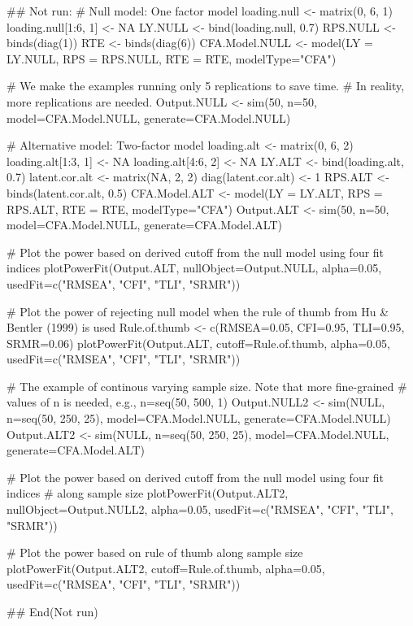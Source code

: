 \documentclass[a4paper]{book}
\begin{document}
\begin{Examples}
\begin{ExampleCode}
## Not run: 
# Null model: One factor model
loading.null <- matrix(0, 6, 1)
loading.null[1:6, 1] <- NA
LY.NULL <- bind(loading.null, 0.7)
RPS.NULL <- binds(diag(1))
RTE <- binds(diag(6))
CFA.Model.NULL <- model(LY = LY.NULL, RPS = RPS.NULL, RTE = RTE, modelType="CFA")

# We make the examples running only 5 replications to save time.
# In reality, more replications are needed.
Output.NULL <- sim(50, n=50, model=CFA.Model.NULL, generate=CFA.Model.NULL) 

# Alternative model: Two-factor model
loading.alt <- matrix(0, 6, 2)
loading.alt[1:3, 1] <- NA
loading.alt[4:6, 2] <- NA
LY.ALT <- bind(loading.alt, 0.7)
latent.cor.alt <- matrix(NA, 2, 2)
diag(latent.cor.alt) <- 1
RPS.ALT <- binds(latent.cor.alt, 0.5)
CFA.Model.ALT <- model(LY = LY.ALT, RPS = RPS.ALT, RTE = RTE, modelType="CFA")
Output.ALT <- sim(50, n=50, model=CFA.Model.NULL, generate=CFA.Model.ALT)

# Plot the power based on derived cutoff from the null model using four fit indices
plotPowerFit(Output.ALT, nullObject=Output.NULL, alpha=0.05, 
	usedFit=c("RMSEA", "CFI", "TLI", "SRMR"))

# Plot the power of rejecting null model when the rule of thumb from Hu & Bentler (1999) is used
Rule.of.thumb <- c(RMSEA=0.05, CFI=0.95, TLI=0.95, SRMR=0.06)
plotPowerFit(Output.ALT, cutoff=Rule.of.thumb, alpha=0.05, 
	usedFit=c("RMSEA", "CFI", "TLI", "SRMR"))

# The example of continous varying sample size. Note that more fine-grained 
# values of n is needed, e.g., n=seq(50, 500, 1)
Output.NULL2 <- sim(NULL, n=seq(50, 250, 25), model=CFA.Model.NULL, generate=CFA.Model.NULL)
Output.ALT2 <- sim(NULL, n=seq(50, 250, 25), model=CFA.Model.NULL, generate=CFA.Model.ALT)

# Plot the power based on derived cutoff from the null model using four fit indices 
# along sample size
plotPowerFit(Output.ALT2, nullObject=Output.NULL2, alpha=0.05, 
	usedFit=c("RMSEA", "CFI", "TLI", "SRMR"))

# Plot the power based on rule of thumb along sample size
plotPowerFit(Output.ALT2, cutoff=Rule.of.thumb, alpha=0.05, 
	usedFit=c("RMSEA", "CFI", "TLI", "SRMR"))

## End(Not run)
\end{ExampleCode}
\end{Examples}
\end{document}
